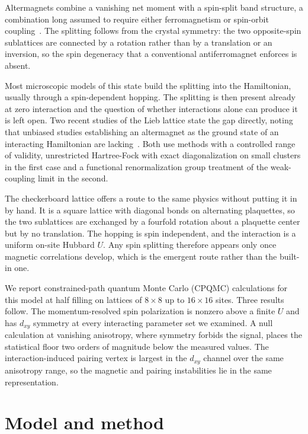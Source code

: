 \documentclass[aps,prb,reprint,superscriptaddress,amsmath,amssymb,floatfix]{revtex4-2}
\begin{document}
Altermagnets combine a vanishing net moment with a spin-split band structure,
a combination long assumed to require either ferromagnetism or spin-orbit
coupling~\cite{Smejkal2022a,Smejkal2022b}. The splitting follows from the
crystal symmetry: the two opposite-spin sublattices are connected by a rotation
rather than by a translation or an inversion, so the spin degeneracy that a
conventional antiferromagnet enforces is absent.

Most microscopic models of this state build the splitting into the Hamiltonian,
usually through a spin-dependent hopping. The splitting is then present already
at zero interaction and the question of whether interactions alone can produce
it is left open. Two recent studies of the Lieb lattice state the gap directly,
noting that unbiased studies establishing an altermagnet as the ground state of
an interacting Hamiltonian are lacking~\cite{Kaushal2025,Duerrnagel2025}. Both
use methods with a controlled range of validity, unrestricted Hartree-Fock with
exact diagonalization on small clusters in the first case and a functional
renormalization group treatment of the weak-coupling limit in the second.

The checkerboard lattice offers a route to the same physics without putting it
in by hand. It is a square lattice with diagonal bonds on alternating
plaquettes, so the two sublattices are exchanged by a fourfold rotation about a
plaquette center but by no translation. The hopping is spin independent, and
the interaction is a uniform on-site Hubbard $U$. Any spin splitting therefore
appears only once magnetic correlations develop, which is the emergent route
rather than the built-in one.

We report constrained-path quantum Monte Carlo (CPQMC) calculations for this
model at half filling on lattices of $8\times8$ up to $16\times16$ sites. Three
results follow. The momentum-resolved spin polarization is nonzero above a
finite $U$ and has $d_{xy}$ symmetry at every interacting parameter set we
examined. A null calculation at vanishing anisotropy, where symmetry forbids the
signal, places the statistical floor two orders of magnitude below the measured
values. The interaction-induced pairing vertex is largest in the $d_{xy}$
channel over the same anisotropy range, so the magnetic and pairing
instabilities lie in the same representation.


\section{Model and method}
\end{document}
